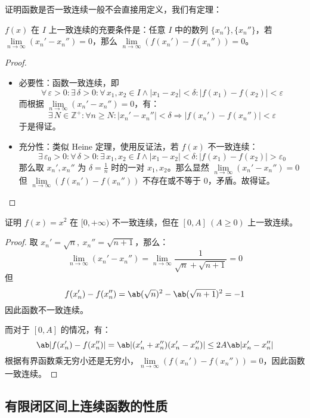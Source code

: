 证明函数是否一致连续一般不会直接用定义，我们有定理：

\begin{theorem}
	$f(x)$ 在 $I$ 上一致连续的充要条件是：任意 $I$ 中的数列 $\{x_n'\},\{x_n''\}$，若 $\lim\limits_{n \to \infty} (x_n' - x_n'') = 0$，那么 $\lim\limits_{n \to \infty} (f(x_n') - f(x_n'')) = 0$。

	\begin{proof}
		\begin{itemize}
			\item 必要性：函数一致连续，即
			$$
			\forall\,\varepsilon > 0: \exists\,\delta > 0: \forall\,x_1, x_2 \in I \land |x_1 - x_2| < \delta: |f(x_1) - f(x_2)| < \varepsilon
			$$
			而根据 $\lim\limits_{n \to \infty} (x_n' - x_n'') = 0$，有：
			$$
			\exists\,N \in \mathbb{Z}^+: \forall n \ge N: |x_n' - x_n''| < \delta \Rightarrow |f(x_n') - f(x_n'')| < \varepsilon
			$$
			于是得证。

			\item 充分性：类似 Heine 定理，使用反证法，若 $f(x)$ 不一致连续：
			$$
			\exists\,\varepsilon_0 > 0: \forall\,\delta > 0: \exists\,x_1, x_2 \in I \land |x_1 - x_2| < \delta: |f(x_1) - f(x_2)| > \varepsilon_0
			$$
			那么取 $x_n', x_n''$ 为 $\delta = \frac{1}{n}$ 时的一对 $x_1, x_2$。那么显然 $\lim\limits_{n \to \infty} (x_n' - x_n'') = 0$ 但 $\lim\limits_{n \to \infty} (f(x_n') - f(x_n''))$ 不存在或不等于 $0$，矛盾。故得证。
		\end{itemize}
	\end{proof}
\end{theorem}

\begin{example}
	证明 $f(x) = x^2$ 在 $[0, +\infty)$ 不一致连续，但在 $[0, A]\ (A \ge 0)$ 上一致连续。

	\begin{proof}
		取 $x_n' = \sqrt{n},\ x_n'' = \sqrt{n + 1}$，那么：
		$$
		\lim_{n \to \infty} (x_n' - x_n'') = \lim_{n \to \infty} \frac{1}{\sqrt{n} + \sqrt{n + 1}} = 0
		$$
		但
		$$
		f(x_n') - f(x_n'') = \ab(\sqrt{n})^2 - \ab(\sqrt{n+1})^2 = -1
		$$
		因此函数不一致连续。

		而对于 $[0, A]$ 的情况，有：
		$$
		\ab|f(x_n') - f(x_n'')| = \ab|(x_n' + x_n'') (x_n' - x_n'')| \le 2A \ab|x_n' - x_n''|
		$$
		根据有界函数乘无穷小还是无穷小，$\lim\limits_{n \to \infty} (f(x_n') - f(x_n'')) = 0$，因此函数一致连续。
	\end{proof}
\end{example}

\subsection{有限闭区间上连续函数的性质}

